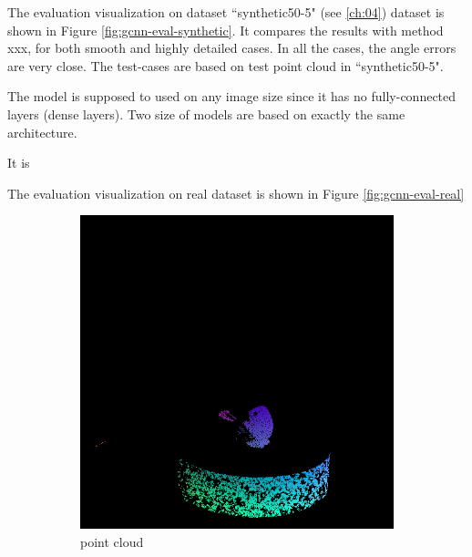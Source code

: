 The evaluation visualization on dataset ``synthetic50-5" (see \ref{ch:04}) dataset is shown in Figure \ref{fig:gcnn-eval-synthetic}. It compares the results with method xxx, for both smooth and highly detailed cases. In all the cases, the angle errors are very close. The test-cases are based on test point cloud in ``synthetic50-5". 

The model is supposed to used on any image size since it has no fully-connected layers (dense layers). Two size of models are based on exactly the same architecture. 

It is 




The evaluation visualization on real dataset is shown in Figure \ref{fig:gcnn-eval-real}
\begin{figure}[h!]
	\centering
	\begin{subfigure}[b]{0.24\linewidth}
		\includegraphics[width=\linewidth]{./Figures/gcnn-real/fancy_eval_1_point_cloud_noise.png}
		\caption{point cloud}
	\end{subfigure}
	\begin{subfigure}[b]{0.24\linewidth}

\end{subfigure}
\end{figure}
